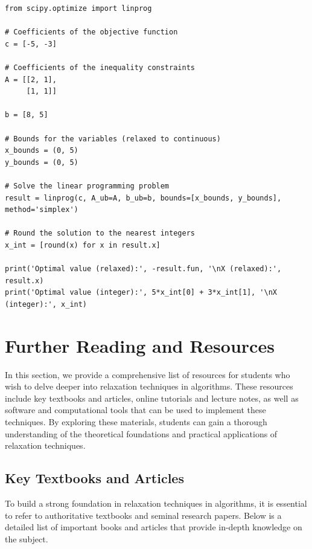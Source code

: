 \documentclass[12pt]{book} %
\begin{document}
\begin{lstlisting}
from scipy.optimize import linprog

# Coefficients of the objective function
c = [-5, -3]

# Coefficients of the inequality constraints
A = [[2, 1],
     [1, 1]]

b = [8, 5]

# Bounds for the variables (relaxed to continuous)
x_bounds = (0, 5)
y_bounds = (0, 5)

# Solve the linear programming problem
result = linprog(c, A_ub=A, b_ub=b, bounds=[x_bounds, y_bounds], method='simplex')

# Round the solution to the nearest integers
x_int = [round(x) for x in result.x]

print('Optimal value (relaxed):', -result.fun, '\nX (relaxed):', result.x)
print('Optimal value (integer):', 5*x_int[0] + 3*x_int[1], '\nX (integer):', x_int)
\end{lstlisting}

\FloatBarrier


\section{Further Reading and Resources}
In this section, we provide a comprehensive list of resources for students who wish to delve deeper into relaxation techniques in algorithms. These resources include key textbooks and articles, online tutorials and lecture notes, as well as software and computational tools that can be used to implement these techniques. By exploring these materials, students can gain a thorough understanding of the theoretical foundations and practical applications of relaxation techniques.

\subsection{Key Textbooks and Articles}
To build a strong foundation in relaxation techniques in algorithms, it is essential to refer to authoritative textbooks and seminal research papers. Below is a detailed list of important books and articles that provide in-depth knowledge on the subject.
\end{document}
